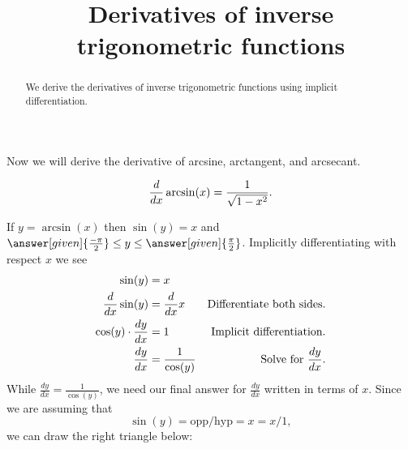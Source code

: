 \documentclass{ximera}
\title{Derivatives of inverse trigonometric functions}
\begin{document}
\begin{abstract}
  We derive the derivatives of inverse trigonometric functions using implicit
  differentiation.
\end{abstract}
\maketitle

Now we will derive the derivative of arcsine, arctangent, and
arcsecant.



\begin{theorem}
\[
\frac{d}{\mathop{}\!d x} \arcsin(x) = \frac{1}{\sqrt{1-x^2}}.
\]
\begin{explanation} 
  If $y=\arcsin(x)$ then $\sin(y) = x$ and $\answer[given]{\frac{-\pi}{2}}\le
  y\le \answer[given]{\frac{\pi}{2}}$.
  Implicitly differentiating with respect $x$ we see
  \begin{align*}
    \sin(y) &= x\\
    \frac{d}{\mathop{}\!d x} \sin(y) &= \frac{d}{\mathop{}\!d x} x &\text{Differentiate both sides.}\\
    \cos(y) \cdot \frac{dy}{dx} &= 1 &\text{Implicit differentiation.}\\
    \frac{dy}{dx} &= \frac{1}{\cos(y)} &\text{Solve for $\frac{dy}{dx}$.}
  \end{align*}
  While $\frac{dy}{dx} = \frac{1}{\cos(y)}$, we need our final answer for $\frac{dy}{dx}$ written
  in terms of $x$. Since we are assuming that
  \[
  \sin(y) =\mbox{opp/hyp}= x=x/1,
  \]
  we can draw the right triangle below:
      \begin{image}[2in]
    \end{image}


\end{explanation}
\end{theorem}
\end{document}
